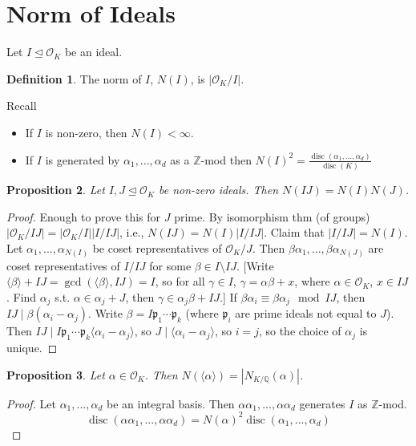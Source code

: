 \documentclass{article}
\theoremstyle{definition}
\newtheorem{defn}{Definition}[section]
\theoremstyle{remark}
\theoremstyle{plain}
\newtheorem{prop}[defn]{Proposition}
\newcommand{\ZZ}{\mathbb{Z}}
\newcommand{\QQ}{\mathbb{Q}}
\newcommand{\disc}{\operatorname{disc}}
\begin{document}
\section{Norm of Ideals}
Let $I\trianglelefteq\mathcal O_K$ be an ideal. 
\begin{defn}
    The norm of $I$, $N(I)$, is $|\mathcal O_K/I|$.
\end{defn}
Recall\begin{itemize}
    \item If $I$ is non-zero, then $N(I)<\infty$.
    \item If $I$ is generated by $\alpha_1,...,\alpha_d$ as a $\ZZ$-mod then $N(I)^2=\frac{\disc(\alpha_1,...,\alpha_d)}{\disc(K)}$
\end{itemize}
\begin{prop}
    Let $I,J\trianglelefteq \mathcal O_K$ be non-zero ideals. Then $N(IJ)=N(I)N(J)$.
\end{prop}
\begin{proof}
    Enough to prove this for $J$ prime. By isomorphism thm (of groups) $|\mathcal O_K/IJ|=|\mathcal O_K/I||I/IJ|$, i.e., $N(IJ)=N(I)|I/IJ|$. Claim that $|I/IJ|=N(I)$. Let $\alpha_1,...,\alpha_{N(I)}$ be coset representatives of $\mathcal O_K/J$. Then $\beta\alpha_1,...,\beta\alpha_{N(J)}$ are coset representatives of $I/IJ$ for some $\beta\in I\setminus IJ$. [Write $\langle\beta\rangle + IJ=\gcd(\langle\beta\rangle,IJ)=I$, so for all $\gamma\in I$, $\gamma=\alpha\beta+x$, where $\alpha\in\mathcal O_K$, $x\in IJ$. Find $\alpha_j$ s.t. $\alpha\in\alpha_j+J$, then $\gamma\in\alpha_j\beta+IJ$.] If $\beta\alpha_i\equiv\beta\alpha_j\mod IJ$, then $IJ\mid \beta(\alpha_i-\alpha_j)$. Write $\beta=I\mathfrak p_1\cdots\mathfrak p_k$ (where $\mathfrak p_i$ are prime ideals not equal to $J$). Then $IJ\mid I\mathfrak p_1\cdots \mathfrak p_k\langle\alpha_i-\alpha_j\rangle$, so $J\mid \langle\alpha_i-\alpha_j\rangle$, so $i=j$, so the choice of $\alpha_j$ is unique.
\end{proof}
\begin{prop}
    Let $\alpha\in\mathcal O_K$. Then $N(\langle\alpha\rangle)=|N_{K/\QQ}(\alpha)|$.
\end{prop}
\begin{proof}
    Let $\alpha_1,...,\alpha_d$ be an integral basis. Then $\alpha\alpha_1,...,\alpha\alpha_d$ generates $I$ as $\ZZ$-mod.
    \[\disc(\alpha\alpha_1,...,\alpha\alpha_d)=N(\alpha)^2\disc(\alpha_1,...,\alpha_d)\]
\end{proof}
\end{document}
